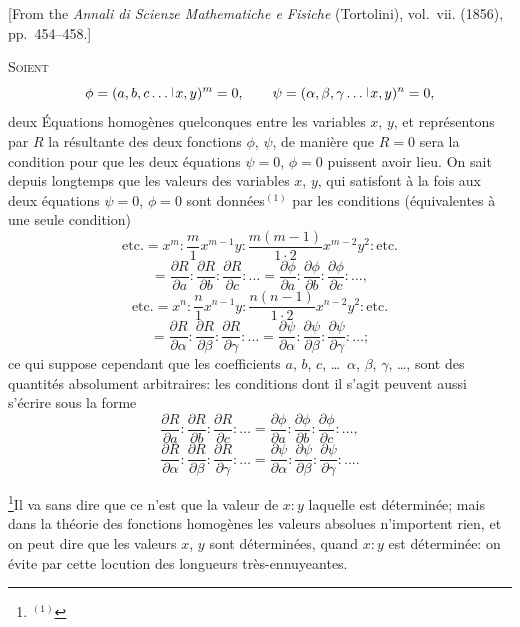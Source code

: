 \documentclass[11pt,a4paper]{book}
\theoremstyle{plain}
\newcommand{\wrule}{\hspace{-0.1em}\mid\hspace{-0.1em}}
\begin{document}
\begin{center}
\small
[From the \textit{Annali di Scienze Mathematiche e Fisiche} (Tortolini), vol.~vii. (1856), pp.~454--458.]
\end{center}

\bigskip

\textsc{Soient}
\[
\phi=(a,b,c\ldots\,\raisebox{0.5ex}{$\scriptstyle\wrule$}\,x,y)^m=0,\qquad
\psi=(\alpha,\beta,\gamma\ldots\,\raisebox{0.5ex}{$\scriptstyle\wrule$}\,x,y)^n=0,
\]
deux \'{E}quations homog\`{e}nes quelconques entre les variables $x$, $y$, et repr\'{e}sentons par $R$ la r\'{e}sultante des deux fonctions $\phi$, $\psi$, de mani\`{e}re que $R=0$ sera la condition pour que les deux \'{e}quations $\psi=0$, $\phi=0$ puissent avoir lieu. On sait depuis longtemps que les valeurs des variables $x$, $y$, qui satisfont \`{a} la fois aux deux \'{e}quations $\psi=0$, $\phi=0$ sont donn\'{e}es$^{(1)}$ par les conditions (\'{e}quivalentes \`{a} une seule condition)
\[
\text{etc.}=x^m:\frac{m}{1}x^{m-1}y:\frac{m(m-1)}{1\cdot 2}x^{m-2}y^2:\text{etc.}
\]
\[
=\frac{\partial R}{\partial a}:\frac{\partial R}{\partial b}:\frac{\partial R}{\partial c}:\ldots
=\frac{\partial\phi}{\partial a}:\frac{\partial\phi}{\partial b}:\frac{\partial\phi}{\partial c}:\ldots,
\]
\[
\text{etc.}=x^n:\frac{n}{1}x^{n-1}y:\frac{n(n-1)}{1\cdot 2}x^{n-2}y^2:\text{etc.}
\]
\[
=\frac{\partial R}{\partial\alpha}:\frac{\partial R}{\partial\beta}:\frac{\partial R}{\partial\gamma}:\ldots
=\frac{\partial\psi}{\partial\alpha}:\frac{\partial\psi}{\partial\beta}:\frac{\partial\psi}{\partial\gamma}:\ldots;
\]
ce qui suppose cependant que les coefficients $a$, $b$, $c$, \ldots\ $\alpha$, $\beta$, $\gamma$, \ldots, sont des quantit\'{e}s absolument arbitraires: les conditions dont il s'agit peuvent aussi s'\'{e}crire sous la forme
\[
\frac{\partial R}{\partial a}:\frac{\partial R}{\partial b}:\frac{\partial R}{\partial c}:\ldots
=\frac{\partial\phi}{\partial a}:\frac{\partial\phi}{\partial b}:\frac{\partial\phi}{\partial c}:\ldots,
\]
\[
\frac{\partial R}{\partial\alpha}:\frac{\partial R}{\partial\beta}:\frac{\partial R}{\partial\gamma}:\ldots
=\frac{\partial\psi}{\partial\alpha}:\frac{\partial\psi}{\partial\beta}:\frac{\partial\psi}{\partial\gamma}:\ldots.
\]

\footnote{$^{(1)}$}{Il va sans dire que ce n'est que la valeur de $x:y$ laquelle est d\'{e}termin\'{e}e; mais dans la th\'{e}orie des fonctions homog\`{e}nes les valeurs absolues n'importent rien, et on peut dire que les valeurs $x$, $y$ sont d\'{e}termin\'{e}es, quand $x:y$ est d\'{e}termin\'{e}e: on \'{e}vite par cette locution des longueurs tr\`{e}s-ennuyeantes.}
\end{document}
